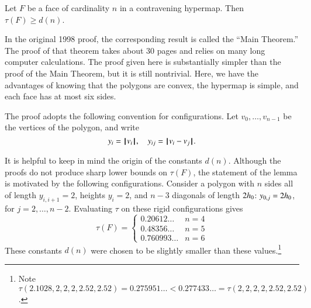 \begin{lemma} %
Let $F$ be a face of cardinality $n$ in a contravening hypermap.  Then
        $\tau(F) \ge d(n)$.
\end{lemma}

In the original 1998 proof, the corresponding result
is called the ``Main Theorem.''  The proof of that 
theorem takes about 30 pages and relies on many
long computer calculations.  The proof given here
is substantially simpler than the proof of the
Main Theorem, but
it is still nontrivial.  Here, we have the advantages
of knowing that the polygons are convex, the hypermap
is simple, and each face has at most six sides.

The proof adopts the following convention for
configurations.  Let $v_0,\ldots,v_{n-1}$ be the vertices
of the polygon, and write
$$
y_i = {{\hskip0.1em|\hskip-0.15em|\hskip0.1em}v_i{\hskip0.1em|\hskip-0.15em|\hskip0.1em}},\quad y_{ij} = {\hskip0.1em|\hskip-0.15em|\hskip0.1em}v_i -  v_j{\hskip0.1em|\hskip-0.15em|\hskip0.1em}.
$$

It is helpful to keep in mind the origin of the constants $d(n)$.
Although the proofs do not produce sharp lower bounds on $\tau(F)$, the
statement of the lemma is motivated by the following configurations.
Consider a polygon with $n$ sides all of length $y_{i,i+1}=2$, heights
$y_i=2$, and $n-3$ diagonals of length $2{h_0}$: $y_{0,j}=2{h_0}$, for
$j=2,\ldots,n-2$.  Evaluating $\tau$ on these rigid configurations gives
$$
\tau(F) = \begin{cases}
0.20612\ldots & n=4\\
0.48356\ldots & n=5\\
0.760993\ldots &n=6
\end{cases}
$$
These constants $d(n)$ were chosen to be slightly smaller than these values.\footnote{Note $\tau(2.1028,2,2,2,2.52,2.52) = 0.275951\ldots < 0.277433\ldots = \tau(2,2,2,2,2.52,2.52)$.}

